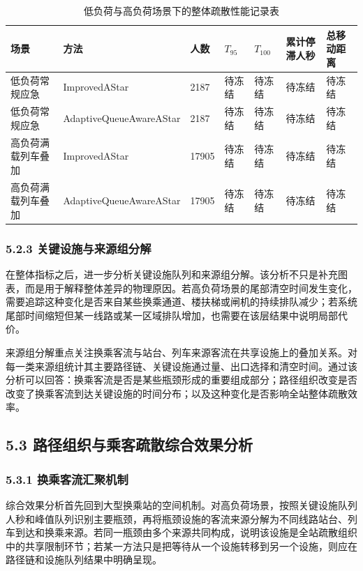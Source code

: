 \documentclass[UTF8,a4paper,12pt]{ctexart}
\begin{document}
\begin{table}[htbp]
\centering
\caption{低负荷与高负荷场景下的整体疏散性能记录表}
\small
\begin{tabular}{p{}p{}p{}p{}p{}p{}p{}}
\toprule
场景 & 方法 & 人数 & \(T_{95}\) & \(T_{100}\) & 累计停滞人秒 & 总移动距离 \\
\midrule
低负荷常规应急 & ImprovedAStar & 2187 & 待冻结 & 待冻结 & 待冻结 & 待冻结 \\
低负荷常规应急 & AdaptiveQueueAwareAStar & 2187 & 待冻结 & 待冻结 & 待冻结 & 待冻结 \\
高负荷满载列车叠加 & ImprovedAStar & 17905 & 待冻结 & 待冻结 & 待冻结 & 待冻结 \\
高负荷满载列车叠加 & AdaptiveQueueAwareAStar & 17905 & 待冻结 & 待冻结 & 待冻结 & 待冻结 \\
\bottomrule
\end{tabular}
\end{table}

\subsubsection{5.2.3 关键设施与来源组分解}

在整体指标之后，进一步分析关键设施队列和来源组分解。该分析不只是补充图表，而是用于解释整体差异的物理原因。若高负荷场景的尾部清空时间发生变化，需要追踪这种变化是否来自某些换乘通道、楼扶梯或闸机的持续排队减少；若系统尾部时间缩短但某一线路或某一区域排队增加，也需要在该层结果中说明局部代价。

来源组分解重点关注换乘客流与站台、列车来源客流在共享设施上的叠加关系。对每一类来源组统计其主要路径链、关键设施通过量、出口选择和清空时间。通过该分析可以回答：换乘客流是否是某些瓶颈形成的重要组成部分；路径组织改变是否改变了换乘客流到达关键设施的时间分布；以及这种变化是否影响全站整体疏散效率。

\subsection{5.3 路径组织与乘客疏散综合效果分析}

\subsubsection{5.3.1 换乘客流汇聚机制}

综合效果分析首先回到大型换乘站的空间机制。对高负荷场景，按照关键设施队列人秒和峰值队列识别主要瓶颈，再将瓶颈设施的客流来源分解为不同线路站台、列车到达和换乘来源。若同一瓶颈由多个来源共同构成，说明该设施是全站疏散组织中的共享限制环节；若某一方法只是把等待从一个设施转移到另一个设施，则应在路径链和设施队列结果中明确呈现。
\end{document}
